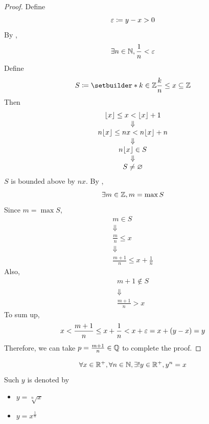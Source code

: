\begin{proof}
    Define
    \[
    \varepsilon \coloneqq y - x > 0
    \]
    By ,
    \[
    \exists n \in \mathbb{N}, \frac{1}{n} < \varepsilon
    \]
    Define
    \[
    S \coloneqq \setbuilder*{k \in \Z}{\frac{k}{n} \leq x} \subseteq \Z
    \]
    Then
    \[
    \begin{array}{c}
        \lfloor x\rfloor \leq x < \lfloor x\rfloor + 1 \\
        \Downarrow \\
        n\lfloor x\rfloor \leq nx < n\lfloor x\rfloor + n \\
        \Downarrow \\
        n\lfloor x\rfloor \in S \\
        \Downarrow \\
        S \neq \varnothing
    \end{array}
    \]
    $S$ is bounded above by $nx$. By ,
    \[
    \exists m \in \mathbb{Z}, m = \max S
    \]
    Since $m = \max S$,
    \[
    \begin{array}{c}
        m \in S \\
        \Downarrow \\
        \frac{m}{n} \leq x \\
        \Downarrow \\
        \frac{m + 1}{n} \leq x + \frac{1}{n}
    \end{array}
    \]
    Also,
    \[
    \begin{array}{c}
        m + 1 \notin S \\
        \Downarrow \\
        \frac{m + 1}{n} > x
    \end{array}
    \]
    To sum up,
    \[
    x < \frac{m + 1}{n} \leq x + \frac{1}{n} < x + \varepsilon = x + (y - x) = y
    \]
    Therefore, we can take $p = \frac{m + 1}{n} \in \mathbb{Q}$ to complete the proof.
\end{proof}

\bigskip

\begin{theorem} \label{an:thm:existence-of-nth-roots}
    \[
    \forall x \in \mathbb{R}^{+}, \forall n \in \mathbb{N}, \exists! y \in \mathbb{R}^{+}, y^{n} = x
    \]
    Such $y$ is denoted by
    \begin{itemize}
        \item $y = \sqrt[n]{x}$
        \item $y = x^{\frac{1}{n}}$
    \end{itemize}
\end{theorem}

